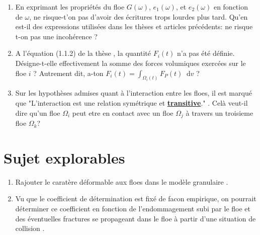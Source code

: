 \documentclass[
  french,
	11pt, %
]{fphw}
\newcommand*\diff{\mathop{}\!\mathrm{d}}
\begin{document}
\begin{enumerate}
  \item En exprimant les propriétés du floe $G(\omega)$, $e_1(\omega)$, et $e_2(\omega)$ en fonction de $\omega$, ne risque-t'on pas d'avoir des écritures trops lourdes plus tard. Qu'en est-il des expressions utilisées dans les thèses et articles précédents: ne risque t-on pas une incohérence ?
  \item A l'équation (1.1.2) de la thèse \parencite[p.16]{rabatel2015thesis}, la quantité $F_i(t)$ n'a pas été définie. Désigne-t-elle effectivement la somme des forces volumiques exercées sur le floe $i$ ? Autrement dit, a-ton $F_i(t) = \int_{\Omega_i(t)} F_P(t) \diff v$ ?
  \item Sur les hypothèses admises quant à l'interaction entre les floes, il est marqué que "L’interaction est une relation symétrique et \underline{\textbf{transitive}}." \parencite[p.18]{rabatel2015thesis}. Celà veut-il dire qu'un floe $\Omega_i$ peut etre en contact avec un floe $\Omega_j$ à travers un troisieme floe $\Omega_k$? 
\end{enumerate}






\section{Sujet explorables}

\begin{enumerate}
  \item Rajouter le caratère déformable aux floes dans le modèle granulaire \parencite[p.12]{rabatel2015thesis}.
  \item Vu que le coefficient de détermination est fixé de facon empirique, on pourrait déterminer ce coefficient en fonction de l’endommagement subi par le floe et des éventuelles fractures se propageant dans le floe à partir d’une situation de collision \parencite[p.14]{rabatel2015thesis}.
\end{enumerate}

\clearpage   %
\printbibliography
\end{document}
